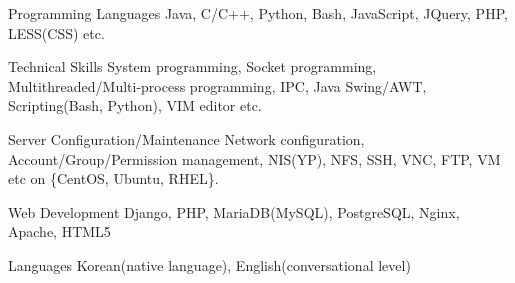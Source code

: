 


\begin{cvskills}


\cvskill
{Programming Languages} %
{Java, C/C++, Python, Bash, JavaScript, JQuery, PHP, LESS(CSS) etc.} %


\cvskill
{Technical Skills} %
{System programming, Socket programming, Multithreaded/Multi-process programming,\newline
IPC, Java Swing/AWT, Scripting(Bash, Python), VIM editor etc.} %


\cvskill
{Server Configuration/Maintenance} %
{Network configuration, Account/Group/Permission management, NIS(YP), NFS, SSH,\newline
VNC, FTP, VM etc on \{CentOS, Ubuntu, RHEL\}.} %


\cvskill
{Web Development} %
{Django, PHP, MariaDB(MySQL), PostgreSQL, Nginx, Apache, HTML5} %


\cvskill
{Languages} %
{Korean(native language), English(conversational level)} %


\end{cvskills}
